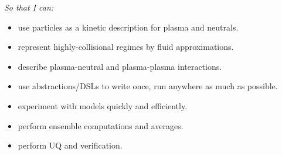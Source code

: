 \emph{So that I can:}

\begin{itemize}
\item use particles as a kinetic description for plasma and neutrals.
\item represent highly-collisional regimes by fluid approximations.
\item describe plasma-neutral and plasma-plasma interactions.
\item use abstractions/DSLs to write once, run anywhere as much as possible.
\item experiment with models quickly and efficiently.
\item perform ensemble computations and averages.
\item perform UQ and verification.
\end{itemize}
